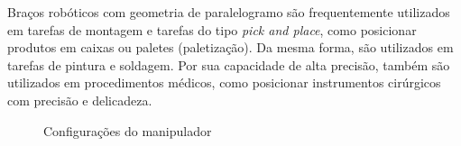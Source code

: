 Braços robóticos com geometria de paralelogramo são frequentemente utilizados em tarefas de montagem e tarefas do tipo \textit{pick and place}, como posicionar produtos em caixas ou paletes (paletização). Da mesma forma, são utilizados em tarefas de pintura e soldagem. Por sua capacidade de alta precisão, também são utilizados em procedimentos médicos, como posicionar instrumentos cirúrgicos com precisão e delicadeza.
\begin{figure}[!htbp]
\centering
    \caption{\label{img:figura2} Configurações do manipulador}

\end{figure}
